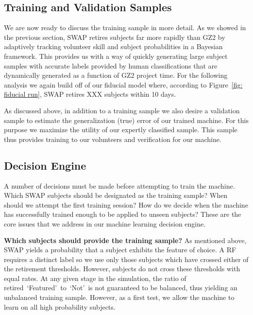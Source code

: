 \documentclass[twocolumn]{aastex6}
\newcommand{\feat}{`Featured'}
\newcommand{\notfeat}{`Not'}
\begin{document}
\subsection{Training and Validation Samples}
We are now ready to discuss the training sample in more detail. As we showed in the previous 
section, SWAP retires subjects far more rapidly than GZ2
by adaptively tracking volunteer skill and subject probabilities in a Bayesian framework.
This provides us with a way of quickly generating large subject samples with accurate
labels provided by human classifications that are dynamically generated as a function
of GZ2 project time. For the following analysis we again build
off of our fiducial model where, according to Figure~\ref{fig: fiducial run},
SWAP retires XXX subjects within 10 days. 

As discussed above, in addition to a training sample we also desire a validation 
sample to estimate the generalization (true) error of our trained machine. For 
this purpose we maximize the utility of our expertly classified sample. This sample
thus provides training to our volunteers and verification for our machine. 

\subsection{Decision Engine}\label{sec: decision engine}
A number of decisions must be made before attempting to train the machine. 
Which SWAP subjects should be designated as the training sample? 
When should we attempt the first training session? 
How do we decide when the machine has successfully trained enough to be
applied to unseen subjects? These are the core issues that we address
in our machine learning decision engine.

\textbf{Which subjects should provide the training sample?} As mentioned above, SWAP
yields a probability that a subject exhibits the feature of choice. A RF requires a
distinct label so we use only those subjects which have crossed either of the 
retirement thresholds. However, subjects do not cross these thresholds with equal rates. 
At any given stage in the simulation, the ratio of retired~\feat~to~\notfeat~is not
guaranteed to be balanced, thus yielding an unbalanced training sample.
 However, as a first test, we allow the machine to learn on all high probability subjects. 
\end{document}
